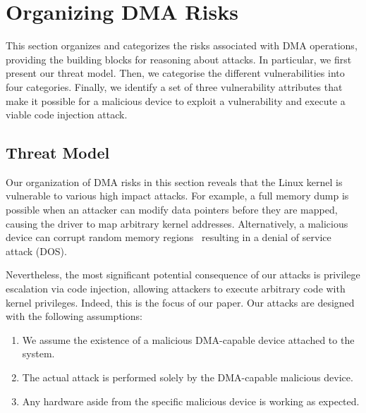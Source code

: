 
\section{Organizing DMA Risks}\label{sec:dma-risks}
This section organizes and categorizes the risks associated with DMA operations, providing the building blocks for reasoning about \DIFdelbegin {}\DIFdelend \DIFaddbegin {}\DIFaddend attacks.
In particular, we first present our threat model. Then, we categorise the different \subpage{} vulnerabilities into four categories.
Finally, we identify a set of three vulnerability attributes that make it possible for a malicious device to exploit a \subpage{} vulnerability and execute a viable code injection attack.

\subsection{Threat Model}\label{sec:threat_model}
Our organization of DMA risks in this section reveals that the Linux kernel is vulnerable to various high impact attacks.
For example, a full memory dump is possible when an attacker can modify data pointers before they are mapped, causing the driver to map arbitrary kernel addresses.
Alternatively, a malicious device can corrupt random memory regions~\cite{MMT16} resulting in a denial of service attack (DOS).


Nevertheless, the most significant potential consequence of our attacks is privilege escalation via code injection, allowing attackers to execute arbitrary code with kernel privileges. Indeed, this is the focus of our paper. 
Our attacks are designed with the following assumptions:
\begin{enumerate}
    \item We assume the existence of a malicious DMA-capable device attached to the system.
    \item The actual attack is performed solely by the DMA-capable malicious device.
    \item Any hardware aside from the specific malicious device is working as expected.
 \end{enumerate}



